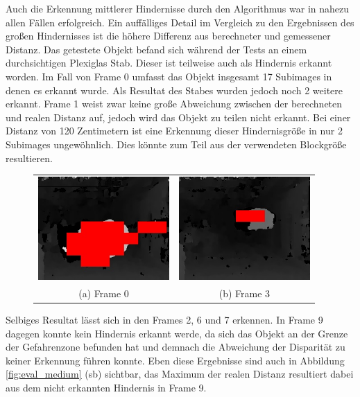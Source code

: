 \noindent
Auch die Erkennung mittlerer Hindernisse durch den Algorithmus war in nahezu allen Fällen erfolgreich. Ein auffälliges Detail im Vergleich zu den Ergebnissen des großen Hindernisses ist die höhere Differenz aus berechneter und gemessener Distanz. Das getestete Objekt befand sich während der Tests an einem durchsichtigen Plexiglas Stab. Dieser ist teilweise auch als Hindernis erkannt worden. Im Fall von Frame 0 umfasst das Objekt insgesamt 17 Subimages in denen es erkannt wurde. Als Resultat des Stabes wurden jedoch noch 2 weitere erkannt. Frame 1 weist zwar keine große Abweichung zwischen der berechneten und realen Distanz auf, jedoch wird das Objekt zu teilen nicht erkannt. Bei einer Distanz von 120 Zentimetern ist eine Erkennung dieser Hindernisgröße in nur 2 Subimages ungewöhnlich. Dies könnte zum Teil aus der verwendeten Blockgröße resultieren.

\begin{figure}[h]
	\centering
	\begin{tabular}{cc}
	\includegraphics[width=5cm]{img/evaluation/medium_test_0_disparity}&
	\includegraphics[width=5cm]{img/evaluation/medium_test_1_disparity}\\
	(a) Frame 0 &  (b) Frame 3
	\end{tabular}
	\caption{}
	\label{fig:eval_medium_fails}
\end{figure}

\noindent
Selbiges Resultat lässt sich in den Frames 2, 6 und 7 erkennen. In Frame 9 dagegen konnte kein Hindernis erkannt werde, da sich das Objekt an der Grenze der Gefahrenzone befunden hat und demnach die Abweichung der Disparität zu keiner Erkennung führen konnte. Eben diese Ergebnisse sind auch in Abbildung \ref{fig:eval_medium} (sb) sichtbar, das Maximum der realen Distanz resultiert dabei aus dem nicht erkannten Hindernis in Frame 9.\\


